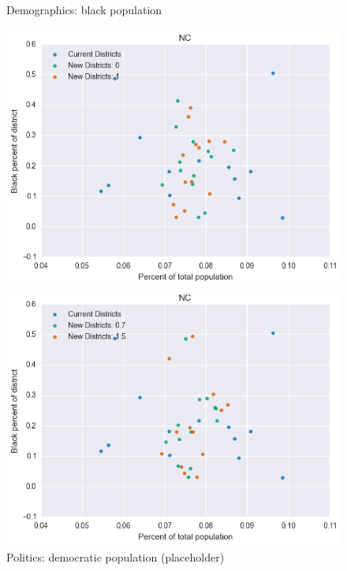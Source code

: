 \begin{figure}[htb!] \centering
\caption{ Demographics: black population }
\includegraphics[width=4.5in]{../analysis/NC/analysis_scatter.png}
\caption{ Politics: democratic population (placeholder)}
\includegraphics[width=4.5in]{../analysis/NC/analysis_scatter2.png}
\end{figure}

\clearpage
\newpage

